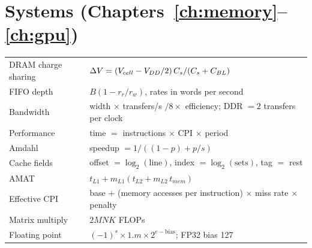 \section*{Systems (Chapters~\ref{ch:memory}--\ref{ch:gpu})}
\begin{center}
\begin{tabularx}{\linewidth}{>{\raggedright\arraybackslash}p{4.6cm}>{\raggedright\arraybackslash}X}
\toprule
DRAM charge sharing & $\Delta V = (V_{cell} - V_{DD}/2)\,C_s/(C_s + C_{BL})$ \\
FIFO depth & $B(1 - r_r/r_w)$, rates in words per second \\
Bandwidth & width $\times$ transfers/s $/ 8 \times$ efficiency; DDR $= 2$ transfers per clock \\
Performance & time $=$ instructions $\times$ CPI $\times$ period \\
Amdahl & speedup $= 1/((1-p) + p/s)$ \\
Cache fields & offset $= \log_2(\text{line})$, index $= \log_2(\text{sets})$, tag $=$ rest \\
AMAT & $t_{L1} + m_{L1}(t_{L2} + m_{L2}\,t_{mem})$ \\
Effective CPI & base $+$ (memory accesses per instruction) $\times$ miss rate $\times$ penalty \\
Matrix multiply & $2MNK$ FLOPs \\
Floating point & $(-1)^s \times 1.m \times 2^{e - \text{bias}}$; FP32 bias 127 \\
\bottomrule
\end{tabularx}
\end{center}

